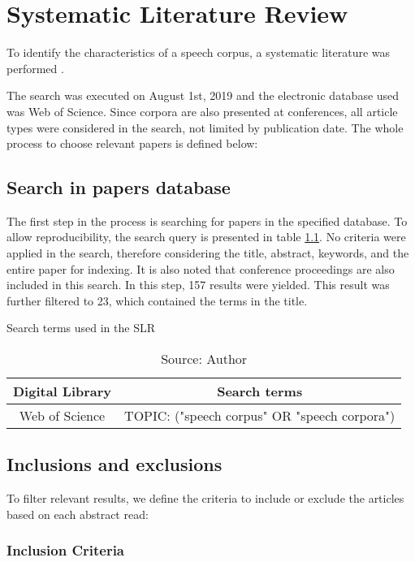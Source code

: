 \chapter{Systematic Literature Review}
\label{chap:slr}

To identify the characteristics of a speech corpus, a systematic literature was performed \cite{kitchenham2009systematic}.

The search was executed on August 1st, 2019 and the electronic database used was Web of Science. Since corpora are also presented at conferences, all article types were considered in the search, not limited by publication date. The whole process to choose relevant papers is defined below:

\section{Search in papers database}

The first step in the process is searching for papers in the specified database. To allow reproducibility, the search query is presented in table \ref{tab:search-terms}. No criteria were applied in the search, therefore considering the title, abstract, keywords, and the entire paper for indexing. It is also noted that conference proceedings are also included in this search. In this step, 157 results were yielded. This result was further filtered to 23, which contained the terms in the title.

\begin{table}[h]
    \centering
    \caption{Search terms used in the SLR}
    \begin{tabular}{|c|c|}
        \hline Digital Library & Search terms \\ \hline
        Web of Science & TOPIC: ("speech corpus" OR "speech corpora")  \\ \hline
    \end{tabular}
    \caption*{Source: Author}
    \label{tab:search-terms}
\end{table}

\section{Inclusions and exclusions}

To filter relevant results, we define the criteria to include or exclude the articles based on each abstract read:

\subsection{Inclusion Criteria}

